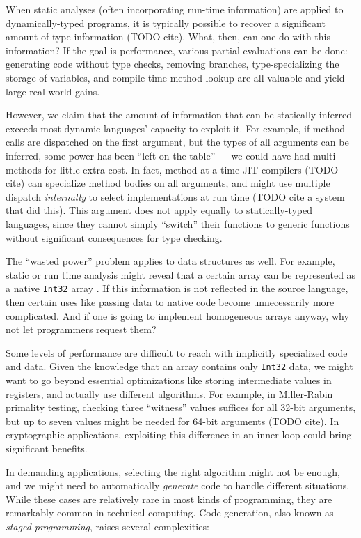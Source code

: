 
When static analyses (often incorporating run-time information) are applied
to dynamically-typed programs, it is typically possible to recover a
significant amount of type information (TODO cite). What, then, can one
do with this information? If the goal is performance, various partial
evaluations can be done: generating code without type checks, removing
branches, type-specializing the storage of variables, and compile-time
method lookup are all valuable and yield large real-world gains.

However, we claim that the amount of information that can be statically inferred
exceeds most dynamic languages' capacity to exploit it. For example,
if method calls are dispatched on the first argument, but the types of all
arguments can be inferred, some power has been ``left on the table'' ---
we could have had multi-methods for little extra cost. In fact, method-at-a-time
JIT compilers (TODO cite) can specialize method bodies on all arguments,
and might use multiple dispatch \emph{internally} to select implementations
at run time (TODO cite a system that did this). This argument does not
apply equally to statically-typed languages, since they cannot simply
``switch'' their functions to generic functions without significant
consequences for type checking.

The ``wasted power'' problem applies to data structures as well.
For example, static or run time analysis might reveal that a certain array
can be represented as a native \texttt{Int32} array \cite{Bolz2013}.
If this information is not reflected in the source language, then
certain uses like passing data to native code become unnecessarily more
complicated.
And if one is going to implement homogeneous arrays anyway, why not
let programmers request them?

Some levels of performance are difficult to reach with implicitly
specialized code and data. Given the knowledge that
an array contains only \texttt{Int32} data, we might want to go
beyond essential optimizations like storing intermediate values in
registers, and actually use different algorithms. For example,
in Miller-Rabin primality testing, checking three ``witness'' values
suffices for all 32-bit arguments, but up to seven values might be
needed for 64-bit arguments (TODO cite).
In cryptographic applications, exploiting this difference in an inner loop
could bring significant benefits.

In demanding applications, selecting the right algorithm might not
be enough, and we might need to automatically \emph{generate} code
to handle different situations. While these cases are relatively rare
in most kinds of programming, they are remarkably common in technical
computing. Code generation, also known as \emph{staged programming},
raises several complexities:


